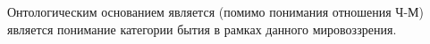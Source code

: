 Онтологическим основанием является (помимо понимания отношения Ч-М)
является понимание категории бытия в рамках данного мировоззрения. 
